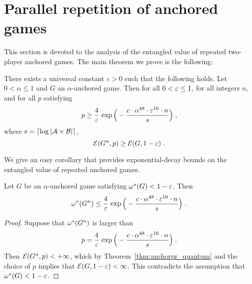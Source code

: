 
\section{Parallel repetition of anchored games}
\label{sec:analysis}

This section is devoted to the analysis of the entangled value of repeated two-player anchored games. The main theorem we prove is the following:


\begin{theorem}\label{thm:anchorpr_quantum}
	There exists a universal constant $c > 0$ such that the following holds. Let $0<\alpha\leq 1$ and $G$ an $\alpha$-anchored game. Then for all $0 < \varepsilon \leq 1$,
for all integers $n$, and for all $p$ satisfying
\begin{equation}
\label{eq:p}
p \geq \frac{4}{\varepsilon} \, \exp \Big ( - \frac{c \cdot \alpha^{48} \cdot \varepsilon^{16} \cdot n}{s} \Big)\;,
\end{equation}
where  $s =\lceil \log |\mathcal{A} \times \mathcal{B}|\rceil$, 
\[
	\mathcal{E}(G^n,p) \geq \mathcal{E}(G,1 - \varepsilon)\;.
\]
\end{theorem}

We give an easy corollary that provides exponential-decay bounds on the entangled value of repeated anchored games.

\begin{corollary}
Let $G$ be an $\alpha$-anchored game satisfying $\omega^*(G) < 1-\varepsilon$. Then
	$$ \omega^*(G^n)\leq \frac{4}{\varepsilon} \, \exp \Big ( - \frac{c \cdot \alpha^{48} \cdot \varepsilon^{16} \cdot n}{s} \Big)~.$$
\end{corollary}
\begin{proof}
	Suppose that $\omega^*(G^n)$ is larger than 
	\[p = \frac{4}{\varepsilon} \, \exp \Big ( - \frac{c \cdot \alpha^{48} \cdot \varepsilon^{16} \cdot n}{s} \Big)\;.\]
	Then $\mathcal{E}(G^n,p) < +\infty$, which by Theorem~\ref{thm:anchorpr_quantum} and the choice of $p$ implies that $\mathcal{E}(G,1 - \varepsilon) < \infty$. This contradicts the assumption that $\omega^*(G) < 1 - \varepsilon$.
\end{proof}


